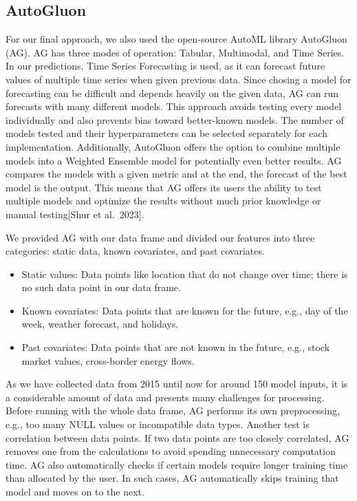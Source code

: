 \documentclass[a4paper]{article}
\begin{document}
    \subsection{AutoGluon}\label{autogluon}

    For our final approach, we also used the open-source AutoML library
AutoGluon (AG). AG has three modes of operation: Tabular, Multimodal,
and Time Series. In our predictions, Time Series Forecasting is used, as
it can forecast future values of multiple time series when given
previous data. Since chosing a model for forecasting can be difficult
and depends heavily on the given data, AG can run forecasts with many
different models. This approach avoids testing every model individually
and also prevents bias toward better-known models. The number of models
tested and their hyperparameters can be selected separately for each
implementation. Additionally, AutoGluon offers the option to combine
multiple models into a Weighted Ensemble model for potentially even
better results. AG compares the models with a given metric and at the
end, the forecast of the best model is the output. This means that AG
offers its users the ability to test multiple models and optimize the
results without much prior knowledge or manual testing{[}Shur et
al.~2023{]}.

We provided AG with our data frame and divided our features into three
categories: static data, known covariates, and past covariates.

\begin{itemize}
\item
  Static values: Data points like location that do not change over time;
  there is no such data point in our data frame.
\item
  Known covariates: Data points that are known for the future, e.g., day
  of the week, weather forecast, and holidays.
\item
  Past covariates: Data points that are not known in the future, e.g.,
  stock market values, cross-border energy flows.
\end{itemize}

As we have collected data from 2015 until now for around 150 model
inputs, it is a considerable amount of data and presents many challenges
for processing. Before running with the whole data frame, AG performs
its own preprocessing, e.g., too many NULL values or incompatible data
types. Another test is correlation between data points. If two data
points are too closely correlated, AG removes one from the calculations
to avoid spending unnecessary computation time. AG also automatically
checks if certain models require longer training time than allocated by
the user. In such cases, AG automatically skips training that model and
moves on to the next.
\end{document}
